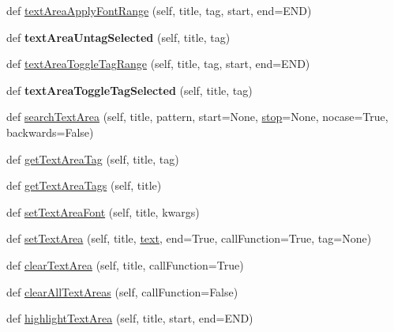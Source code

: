 \begin{DoxyCompactItemize}
def \hyperlink{class_python_01_g_u_i_1_1appjar_1_1gui_a08b141cc46f5b25c4154308f224d2f5e}{text\+Area\+Apply\+Font\+Range} (self, title, tag, start, end=E\+ND)
\item 
\mbox{\label{class_python_01_g_u_i_1_1appjar_1_1gui_a97e6229e49236c8bdadeb640a3c9619d}} 
def {\bfseries text\+Area\+Untag\+Selected} (self, title, tag)
\item 
def \hyperlink{class_python_01_g_u_i_1_1appjar_1_1gui_ae0713bb69c5572ceca600ac6e24454d9}{text\+Area\+Toggle\+Tag\+Range} (self, title, tag, start, end=E\+ND)
\item 
\mbox{\label{class_python_01_g_u_i_1_1appjar_1_1gui_a8447402ee6fe5e27eaeb7144e5bb3051}} 
def {\bfseries text\+Area\+Toggle\+Tag\+Selected} (self, title, tag)
\item 
def \hyperlink{class_python_01_g_u_i_1_1appjar_1_1gui_adcbc770a81cc67dbac6f8f6f6980afa4}{search\+Text\+Area} (self, title, pattern, start=None, \hyperlink{class_python_01_g_u_i_1_1appjar_1_1gui_a09fd0d3197efd74785125a04344eac6d}{stop}=None, nocase=True, backwards=False)
\item 
def \hyperlink{class_python_01_g_u_i_1_1appjar_1_1gui_ade30456e535cdeb47c70ca8bf595b8b7}{get\+Text\+Area\+Tag} (self, title, tag)
\item 
def \hyperlink{class_python_01_g_u_i_1_1appjar_1_1gui_a6fcbce0beeb322c6637cad80fe3d952b}{get\+Text\+Area\+Tags} (self, title)
\item 
def \hyperlink{class_python_01_g_u_i_1_1appjar_1_1gui_a4eb9ac92c49c04cca555f15837623aa4}{set\+Text\+Area\+Font} (self, title, kwargs)
\item 
def \hyperlink{class_python_01_g_u_i_1_1appjar_1_1gui_a55584b1e094306acb04bea1c45acf414}{set\+Text\+Area} (self, title, \hyperlink{class_python_01_g_u_i_1_1appjar_1_1gui_a6a060ddfec169e464326a0dd179a559e}{text}, end=True, call\+Function=True, tag=None)
\item 
def \hyperlink{class_python_01_g_u_i_1_1appjar_1_1gui_a0e0c17c248b4e53c3039497db525e041}{clear\+Text\+Area} (self, title, call\+Function=True)
\item 
def \hyperlink{class_python_01_g_u_i_1_1appjar_1_1gui_aed07ef3bc3baf1e1b1545ba0cf12c7e1}{clear\+All\+Text\+Areas} (self, call\+Function=False)
\item 
def \hyperlink{class_python_01_g_u_i_1_1appjar_1_1gui_a73b1590d6dbc5bce7912a9cd4ede4027}{highlight\+Text\+Area} (self, title, start, end=E\+ND)

\end{DoxyCompactItemize}
